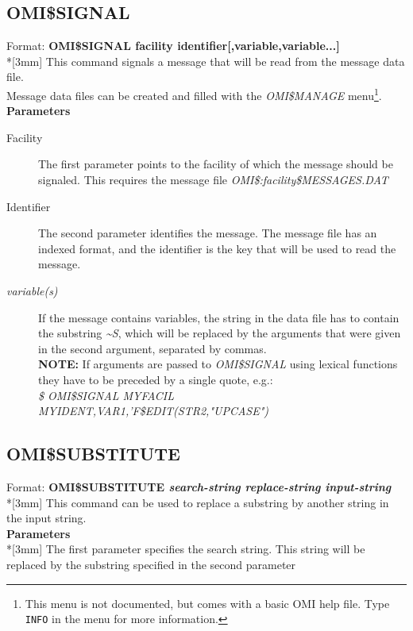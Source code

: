 \documentclass[a4paper]{book}
\renewcommand{\indent}{\hspace*{5mm}}
\begin{document}
\subsection{OMI{\$}SIGNAL}
\label{subsubsec:mylabel61}

\indent Format: \textbf{OMI{\$}SIGNAL \textsf{facility identifier[,variable,variable...]}}\\*[3mm]
This command signals a message that will be read from the message data file. \\
Message data files can be created and filled with the \textsl{OMI{\$}MANAGE} menu\footnote{ This menu is not documented, but comes with a basic OMI help file. Type \texttt{INFO} in the menu for more information.}.\\[3mm]
\textbf{Parameters}

\begin{description}
\item[Facility]
The first parameter points to the facility of which the message should be 
signaled. This requires the message file 
\textsl{OMI{\$}:\textit{facility}{\$}MESSAGES.DAT}

\item[Identifier]
The second parameter identifies the message. The message file has an indexed 
format, and the identifier is the key that will be used to read the message.

\item[\textit{variable(s)}]
If the message contains variables, the string in the data file has to 
contain the substring \textsl{\~{}S}, which will be replaced by the arguments that were 
given in the second argument, separated by commas.\\
\hspace{-3mm}\textbf{NOTE:} If arguments are passed to \textsl{OMI{\$}SIGNAL} using lexical 
functions they have to be preceded by a single quote, e.g.: \\
\textsl{{\$} OMI{\$}SIGNAL MYFACIL MYIDENT,VAR1,'F{\$}EDIT(STR2,"UPCASE")}
\end{description}

\subsection{OMI{\$}SUBSTITUTE}
\label{subsubsec:mylabel62}

\indent Format: \textbf{OMI{\$}SUBSTITUTE \textit{search-string replace-string input-string}}\\*[3mm]
This command can be used to replace a substring by another string in the 
input string.\\[3mm]
\textbf{Parameters}\\*[3mm]
The first parameter specifies the search string. This string will be 
replaced by the substring specified in the second parameter
\end{document}
